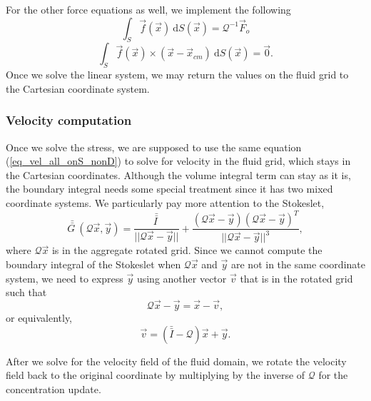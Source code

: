 For the other force equations as well, we implement the following
\begin{equation}
	\int_{S} \vec{f}(\vec{x}) \  \text{d}S(\vec{x})
	= \mathcal{Q}^{-1} \vec{F}_o
	 \label{eq_drag_code}
	 \end{equation} 
	 \begin{equation}
		 \int_S \vec{f} (\vec{x})  \times (\vec{x} - \vec{x}_{cm}) 
		 \ \textrm{d}S(\vec{x}) 
		 = \vec{0}.
	 \label{eq_torque_code}
	 \end{equation}
Once we solve the linear system, we may return the values on the fluid grid to the Cartesian coordinate system.

\subsubsection{Velocity computation}
Once we solve the stress, we are supposed to use the same 
equation (\ref{eq_vel_all_onS_nonD}) 
to solve for velocity in the fluid grid, which stays in the Cartesian coordinates.
Although the volume integral term can stay as it is,  
the boundary integral needs some special treatment
since it has two mixed coordinate systems.
We particularly pay more attention to the Stokeslet,
\[
	\bar{\bar{G \ }} (\mathcal{Q}\vec{x},\vec{y}) 
	= 
	\frac{\bar{\bar{I \ }}}{||\mathcal{Q}\vec{x}-\vec{y} ||} 
	+ \frac{(\mathcal{Q}\vec{x}-\vec{y})(\mathcal{Q}\vec{x}-\vec{y})^T}{||\mathcal{Q}\vec{x}-\vec{y} ||^3}, 	 
\]
where $\mathcal{Q}\vec{x}$ is in the aggregate rotated grid. Since we cannot compute the boundary integral of the Stokeslet when $\mathcal{Q}\vec{x}$ and $\vec{y}$ are not in the same coordinate system, we need to express $\vec{y}$ using another vector $\vec{v}$ that is in the rotated grid such that 
\[
	\mathcal{Q}\vec{x} - \vec{y} = \vec{x} - \vec{v},
\]
or equivalently,
\[
	\vec{v} = \left(   \bar{\bar{I}} - \mathcal{Q} \right) \vec{x}  + \vec{y}.
\]


After we solve for the velocity field of the fluid domain, we rotate the velocity field back to the original coordinate by multiplying by the inverse of $\mathcal{Q}$ for the concentration update. 
